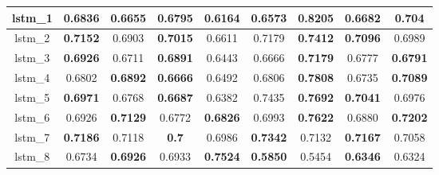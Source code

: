\begin{table}[p]
\begin{tabular}{|c|c|c|c|c|c|c|c|c|}
        lstm\_1  & \textbf{0.6836}                     & 0.6655                              & \textbf{0.6795}                     & 0.6164                              & 0.6573                              & \textbf{\cellcolor{green!50}0.8205} & 0.6682                              & \textbf{0.704}                      \\ \hline
        lstm\_2  & \textbf{0.7152}                     & 0.6903                              & \textbf{0.7015}                     & 0.6611                              & 0.7179                              & \textbf{0.7412}                     & \textbf{0.7096}                     & 0.6989                              \\ \hline
        lstm\_3  & \textbf{0.6926}                     & 0.6711                              & \textbf{0.6891}                     & 0.6443                              & 0.6666                              & \textbf{0.7179}                     & 0.6777                              & \textbf{0.6791}                     \\ \hline
        lstm\_4  & 0.6802                              & \textbf{0.6892}                     & \textbf{0.6666}                     & 0.6492                              & 0.6806                              & \textbf{0.7808}                     & 0.6735                              & \textbf{0.7089}                     \\ \hline
        lstm\_5  & \textbf{0.6971}                     & 0.6768                              & \textbf{0.6687}                     & 0.6382                              & 0.7435                              & \textbf{0.7692}                     & \textbf{0.7041}                     & 0.6976                              \\ \hline
        lstm\_6  & 0.6926                              & \textbf{\cellcolor{green!50}0.7129} & 0.6772                              & \textbf{0.6826}                     & 0.6993                              & \textbf{0.7622}                     & 0.6880                              & \textbf{\cellcolor{green!50}0.7202} \\ \hline
        lstm\_7  & \textbf{\cellcolor{green!50}0.7186} & 0.7118                              & \textbf{0.7}                        & 0.6986                              & \textbf{0.7342}                     & 0.7132                              & \textbf{\cellcolor{green!50}0.7167} & 0.7058                              \\ \hline
        lstm\_8  & 0.6734                              & \textbf{0.6926}                     & 0.6933                              & \textbf{\cellcolor{green!50}0.7524} & \textbf{0.5850}                     & 0.5454                              & \textbf{0.6346}                     & 0.6324                              \\ \hline

\end{tabular}
\end{table}
